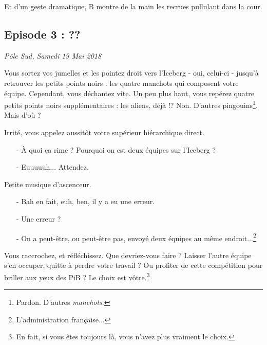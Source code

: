 Et d'un geste dramatique, B montre de la main les recrues pullulant dans la
cour.

\subsection{Episode 3 : ??}
\hfill \textit{Pôle Sud, Samedi 19 Mai 2018}

Vous sortez vos jumelles et les pointez droit vers l'Iceberg - oui, celui-ci -
jusqu'à retrouver les petits points noirs : les quatre manchots qui composent
votre équipe.
Cependant, vous déchantez vite. Un peu plus haut, vous repérez quatre petits
points noirs supplémentaires : les aliens, déjà !? Non. D'autres
pingouins\footnote{Pardon. D'autres \emph{manchots}.}. Mais d'où ?

Irrité, vous appelez aussitôt votre supérieur hiérarchique direct.

\begin{itemize}
    \item[-] À quoi ça rime ? Pourquoi on est deux équipes sur l'Iceberg ?
    \item[-] Euuuuuh... Attendez.
\end{itemize}

Petite musique d'ascenceur.

\begin{itemize}
    \item[-] Bah en fait, euh, ben, il y a eu une erreur.
    \item[-] Une erreur ?
    \item[-] On a peut-être, ou peut-être pas, envoyé deux équipes au même
        endroit...\footnote{L'administration française...}
\end{itemize}

Vous raccrochez, et réfléchissez. Que devriez-vous faire ? Laisser l'autre
équipe s'en occuper, quitte à perdre votre travail ? Ou profiter de cette
compétition pour briller aux yeux des PiB ? Le choix est vôtre.\footnote{En
fait, si vous êtes toujours là, vous n'avez plus vraiment le choix.}
